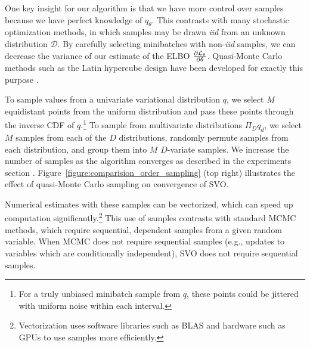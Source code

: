 One key insight for our algorithm is that we have more control over
samples because we have perfect knowledge of $q_\theta$.  This
contrasts with many stochastic optimization methods, in which samples
may be drawn \emph{iid} from an unknown distribution $\mathcal{D}$.
By carefully selecting minibatches with non-\emph{iid} samples, we can
decrease the variance of our estimate of the ELBO $\frac{\partial  \mathcal{L}_\theta
}{\partial \theta}$.  Quasi-Monte Carlo methods such as the Latin hypercube
design have been developed for exactly this purpose
\cite{tang:1993,owen:1998,niederreiter:1992}.

To sample values from a univariate variational distribution $q$, we
select $M$ equidistant points from the uniform distribution and pass
these points through the inverse CDF of $q$.\footnote{For a truly
  unbiased minibatch sample from $q$, these points could be jittered
  with uniform noise within each interval.} To sample from
multivariate distributions $\Pi_D q_d$, we select $M$ samples from
each of the $D$ distributions, randomly permute samples from each
distribution, and group them into $M$ $D$-variate samples. We increase
the number of samples as the algorithm converges as described in the
experiments section
\cite{wei:1990}. Figure~\ref{figure:comparision_order_sampling} (top
right) illustrates the effect of quasi-Monte Carlo sampling on
convergence of SVO.

Numerical estimates with these samples can be vectorized, which can
speed up computation significantly.\footnote{Vectorization uses
  software libraries such as BLAS and hardware such as GPUs to use
  samples more efficiently.}  This use of samples contrasts with
standard MCMC methods, which require sequential, dependent samples
from a given random variable.  When MCMC does not require sequential
samples (e.g., updates to variables which are conditionally
independent), SVO does not require sequential samples.

